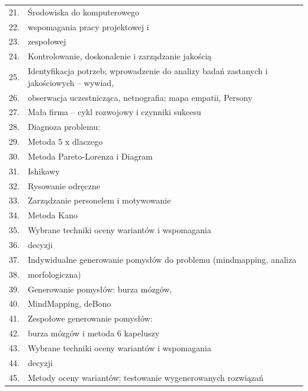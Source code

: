 \documentclass[12pt, a4paper]{article}
\begin{document}
{\begin{longtable}{m{1.5cm}m{14.5cm}}
  \rowcolor{tableRowLight} 21. & Środowiska do komputerowego \\
  \rowcolor{tableRowAlt} 22. & wspomagania pracy projektowej i \\
  \rowcolor{tableRowLight} 23. & zespołowej \\
  \rowcolor{tableRowAlt} 24. & Kontrolowanie, doskonalenie i zarządzanie jakością \\
  \rowcolor{tableRowLight} 25. & Identyfikacja potrzeb; wprowadzenie do analizy badań zastanych i jakościowych – wywiad, \\
  \rowcolor{tableRowAlt} 26. & obserwacja uczestnicząca, netnografia; mapa empatii, Persony \\
  \rowcolor{tableRowLight} 27. & Mała firma – cykl rozwojowy i czynniki sukcesu \\
  \rowcolor{tableRowAlt} 28. & Diagnoza problemu: \\
  \rowcolor{tableRowLight} 29. & Metoda 5 x dlaczego \\
  \rowcolor{tableRowAlt} 30. & Metoda Pareto-Lorenza i Diagram \\
  \rowcolor{tableRowLight} 31. & Ishikawy \\
  \rowcolor{tableRowAlt} 32. & Rysowanie odręczne \\
  \rowcolor{tableRowLight} 33. & Zarządzanie personelem i motywowanie \\
  \rowcolor{tableRowAlt} 34. & Metoda Kano \\
  \rowcolor{tableRowLight} 35. & Wybrane techniki oceny wariantów i wspomagania \\
  \rowcolor{tableRowAlt} 36. & decyzji \\
  \rowcolor{tableRowLight} 37. & Indywidualne generowanie pomysłów do problemu (mindmapping, analiza \\
  \rowcolor{tableRowAlt} 38. & morfologiczna) \\
  \rowcolor{tableRowLight} 39. & Generowanie pomysłów: burza mózgów, \\
  \rowcolor{tableRowAlt} 40. & MindMapping, deBono \\
  \rowcolor{tableRowLight} 41. & Zespołowe generowanie pomysłów: \\
  \rowcolor{tableRowAlt} 42. & burza mózgów i metoda 6 kapeluszy \\
  \rowcolor{tableRowLight} 43. & Wybrane techniki oceny wariantów i wspomagania \\
  \rowcolor{tableRowAlt} 44. & decyzji \\
  \rowcolor{tableRowLight} 45. & Metody oceny wariantów; testowanie wygenerowanych rozwiązań \\

\end{longtable}}
\end{document}
